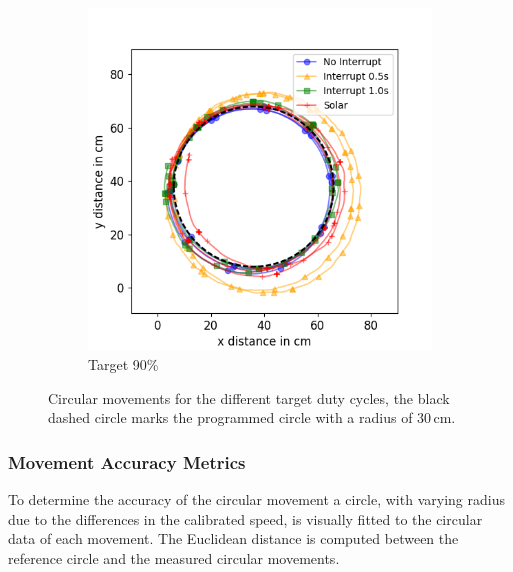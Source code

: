 \begin{figure}[h!]
	\begin{subfigure}[b]{0.49\textwidth}
		\includegraphics[width=\textwidth]{pics/circle_90.png}
		\caption{Target 90\%}
		\label{fig:circ_exp3}
	\end{subfigure}
	\caption{Circular movements for the different target duty cycles, the black dashed circle marks the programmed circle with a radius of 30\,cm.}
	\label{fig:circular_movements}
\end{figure}

\subsubsection{Movement Accuracy Metrics}

To determine the accuracy of the circular movement a circle, with varying radius due to the differences in the calibrated speed, is visually fitted to the circular data of each movement.
The Euclidean distance is computed between the reference circle and the measured circular movements.


